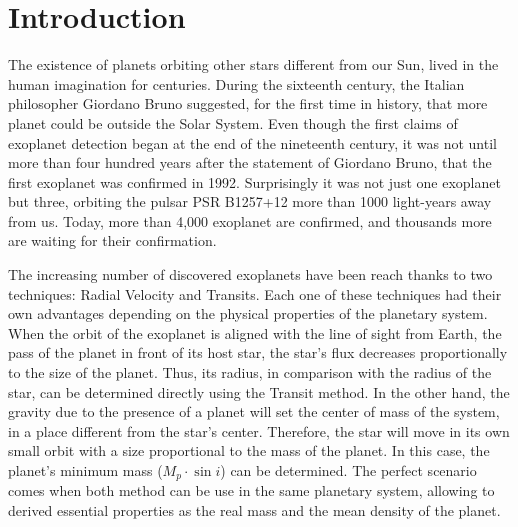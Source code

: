 \chapter{Introduction}\label{chap:intro}
The existence of planets orbiting other stars different from our Sun, lived in the human imagination for centuries. During the sixteenth century, the Italian philosopher Giordano Bruno suggested, for the first time in history, that more planet could be outside the Solar System. Even though the first claims of exoplanet detection began at the end of the nineteenth century, it was not until more than four hundred years after the statement of Giordano Bruno, that the first exoplanet was confirmed in 1992. Surprisingly it was not just one exoplanet but three, orbiting the pulsar PSR B1257+12 more than 1000 light-years away from us. Today, more than 4,000 exoplanet are confirmed, and thousands more are waiting for their confirmation.

The increasing number of discovered exoplanets have been reach thanks to two techniques: Radial Velocity and Transits. Each one of these techniques had their own advantages depending on the physical properties of the planetary system. When the orbit of the exoplanet is aligned with the line of sight from Earth, the pass of the planet in front of its host star, the star's flux decreases proportionally to the size of the planet. Thus, its radius, in comparison with the radius of the star, can be determined directly using the Transit method. In the other hand, the gravity due to the presence of a planet will set the center of mass of the system, in a place different from the star's center. Therefore, the star will move in its own small orbit with a size proportional to the mass of the planet. In this case, the planet's minimum mass ($M_{p}\cdot \sin i$) can be determined. The perfect scenario comes when both method can be use in the same planetary system, allowing to derived essential properties as the real mass and the mean density of the planet.


